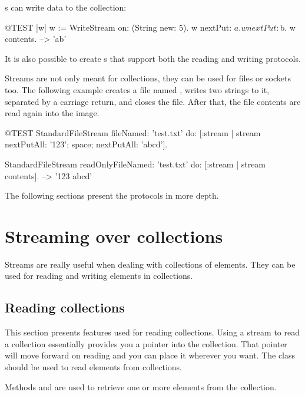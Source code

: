 \documentclass[a4paper,10pt,twoside]{book}
\begin{document}
s can write data to the collection:
\begin{code}{@TEST |w|}
w := WriteStream on: (String new: 5).
w nextPut: $a.
w nextPut: $b.
w contents. -->  'ab'
\end{code}

It is also possible to create s that support both the reading and writing protocols.

Streams are not only meant for collections, they can be used for files or sockets too.
The following example creates a file named , writes two strings to it, separated by a carriage return, and closes the file.
After that, the file contents are read again into the image.

\begin{code}{@TEST}
StandardFileStream
  fileNamed: 'test.txt'
  do: [:stream | stream
        nextPutAll: '123';
        space;
        nextPutAll: 'abcd'].

StandardFileStream readOnlyFileNamed: 'test.txt' do: [:stream | stream contents]. --> '123 abcd'
\end{code}

The following sections present the protocols in more depth.

\section{Streaming over collections}

Streams are really useful when dealing with collections of elements.
They can be used for reading and writing elements in collections.

\subsection{Reading collections}

This section presents features used for reading collections.
Using a stream to read a collection essentially provides you a pointer into the collection.
That pointer will move forward on reading and you can place it wherever you want.
The class  should be used to read elements from collections.

Methods  and  are used to retrieve one or more elements from the collection.
\end{document}

